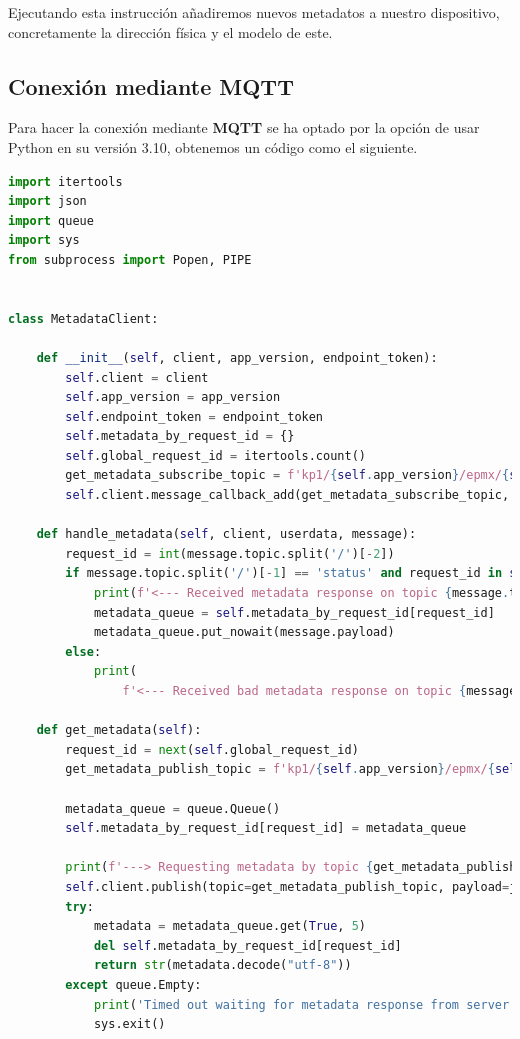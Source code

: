 {Ejecutando esta instrucción añadiremos nuevos metadatos a nuestro dispositivo, concretamente la dirección física y el modelo de este.

\subsection{Conexión mediante MQTT} \label{mqtt-connection}

Para hacer la conexión mediante \textbf{MQTT} se ha optado por la opción de usar Python en su versión 3.10, obtenemos un código como el siguiente.

\begin{lstlisting}[language=Python]
import itertools
import json
import queue
import sys
from subprocess import Popen, PIPE


class MetadataClient:

    def __init__(self, client, app_version, endpoint_token):
        self.client = client
        self.app_version = app_version
        self.endpoint_token = endpoint_token
        self.metadata_by_request_id = {}
        self.global_request_id = itertools.count()
        get_metadata_subscribe_topic = f'kp1/{self.app_version}/epmx/{self.endpoint_token}/get/#'
        self.client.message_callback_add(get_metadata_subscribe_topic, self.handle_metadata)

    def handle_metadata(self, client, userdata, message):
        request_id = int(message.topic.split('/')[-2])
        if message.topic.split('/')[-1] == 'status' and request_id in self.metadata_by_request_id:
            print(f'<--- Received metadata response on topic {message.topic}')
            metadata_queue = self.metadata_by_request_id[request_id]
            metadata_queue.put_nowait(message.payload)
        else:
            print(
                f'<--- Received bad metadata response on topic {message.topic}:\n{str(message.payload.decode("utf-8"))}')

    def get_metadata(self):
        request_id = next(self.global_request_id)
        get_metadata_publish_topic = f'kp1/{self.app_version}/epmx/{self.endpoint_token}/get/{request_id}'

        metadata_queue = queue.Queue()
        self.metadata_by_request_id[request_id] = metadata_queue

        print(f'---> Requesting metadata by topic {get_metadata_publish_topic}')
        self.client.publish(topic=get_metadata_publish_topic, payload=json.dumps({}))
        try:
            metadata = metadata_queue.get(True, 5)
            del self.metadata_by_request_id[request_id]
            return str(metadata.decode("utf-8"))
        except queue.Empty:
            print('Timed out waiting for metadata response from server')
            sys.exit()


\end{lstlisting}}
